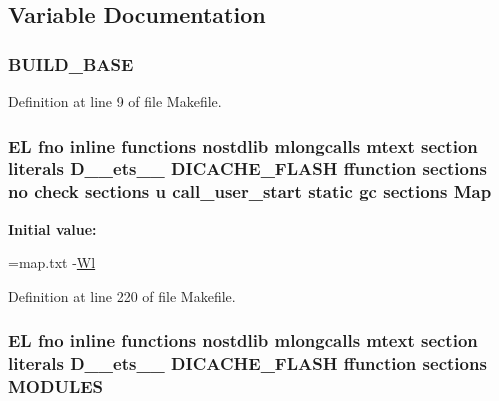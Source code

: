 \subsection{Variable Documentation}
\hypertarget{Makefile_aaa9bbf75d7f8fc94a5c7dd9504b7a178}{
\subsubsection[{B\-U\-I\-L\-D\-\_\-\-B\-A\-S\-E}]{\setlength{\rightskip}{0pt plus 5cm}B\-U\-I\-L\-D\-\_\-\-B\-A\-S\-E}}\label{Makefile_aaa9bbf75d7f8fc94a5c7dd9504b7a178}


Definition at line 9 of file Makefile.

\hypertarget{Makefile_a3f923b64cf6726ab0bfdd17b9aff0a96}{
\subsubsection[{Map}]{\setlength{\rightskip}{0pt plus 5cm}E\-L fno inline functions nostdlib mlongcalls mtext section literals D\-\_\-\-\_\-ets\-\_\-\-\_\- D\-I\-C\-A\-C\-H\-E\-\_\-\-F\-L\-A\-S\-H ffunction sections no check sections u call\-\_\-user\-\_\-start static gc sections Map\hspace{0.3cm}{\ttfamily [static]}}}\label{Makefile_a3f923b64cf6726ab0bfdd17b9aff0a96}
{\bfseries Initial value\-:}
\begin{DoxyCode}
=map.txt  
-\hyperlink{Makefile_afb1782b240d70229ae5bc6b111f9794a}{Wl}
\end{DoxyCode}


Definition at line 220 of file Makefile.

\hypertarget{Makefile_af8b8a61c029c5ab0a5518b7f5421c6ac}{
\subsubsection[{M\-O\-D\-U\-L\-E\-S}]{\setlength{\rightskip}{0pt plus 5cm}E\-L fno inline functions nostdlib mlongcalls mtext section literals D\-\_\-\-\_\-ets\-\_\-\-\_\- D\-I\-C\-A\-C\-H\-E\-\_\-\-F\-L\-A\-S\-H ffunction sections M\-O\-D\-U\-L\-E\-S}}\label{Makefile_af8b8a61c029c5ab0a5518b7f5421c6ac}


